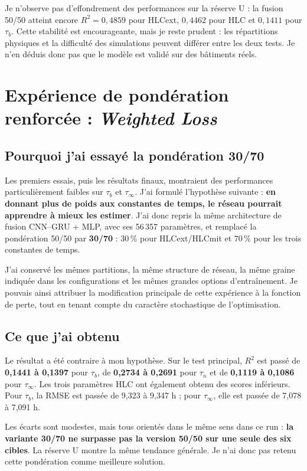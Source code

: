 \documentclass[10pt,a4paper]{article}
\begin{document}
Je n'observe pas d'effondrement des performances sur la réserve U : la fusion 50/50 atteint encore $R^2=0{,}4859$ pour HLCext, $0{,}4462$ pour HLC et $0{,}1411$ pour $\tau_b$. Cette stabilité est encourageante, mais je reste prudent : les répartitions physiques et la difficulté des simulations peuvent différer entre les deux tests. Je n'en déduis donc pas que le modèle est validé sur des bâtiments réels.

\section{Expérience de pondération renforcée : \emph{Weighted Loss}}

\subsection{Pourquoi j'ai essayé la pondération 30/70}
Les premiers essais, puis les résultats finaux, montraient des performances particulièrement faibles sur $\tau_b$ et $\tau_\infty$. J'ai formulé l'hypothèse suivante : \textbf{en donnant plus de poids aux constantes de temps, le réseau pourrait apprendre à mieux les estimer}. J'ai donc repris la même architecture de fusion CNN--GRU + MLP, avec ses 56\,357 paramètres, et remplacé la pondération 50/50 par \textbf{30/70} : 30\,\% pour HLCext/HLCmit et 70\,\% pour les trois constantes de temps.

J'ai conservé les mêmes partitions, la même structure de réseau, la même graine indiquée dans les configurations et les mêmes grandes options d'entraînement. Je pouvais ainsi attribuer la modification principale de cette expérience à la fonction de perte, tout en tenant compte du caractère stochastique de l'optimisation.

\subsection{Ce que j'ai obtenu}
Le résultat a été contraire à mon hypothèse. Sur le test principal, $R^2$ est passé de \textbf{0,1441 à 0,1397} pour $\tau_b$, de \textbf{0,2734 à 0,2691} pour $\tau_n$ et de \textbf{0,1119 à 0,1086} pour $\tau_\infty$. Les trois paramètres HLC ont également obtenu des scores inférieurs. Pour $\tau_b$, la RMSE est passée de 9,323 à 9,347 h ; pour $\tau_\infty$, elle est passée de 7,078 à 7,091 h.

Les écarts sont modestes, mais tous orientés dans le même sens dans ce run : \textbf{la variante 30/70 ne surpasse pas la version 50/50 sur une seule des six cibles}. La réserve U montre la même tendance générale. Je n'ai donc pas retenu cette pondération comme meilleure solution.
\end{document}
